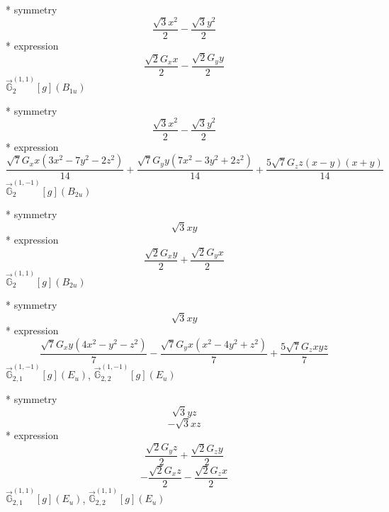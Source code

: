 \documentclass[fleqn,8pt]{jsarticle}
\begin{document}
\noindent\quad ** symmetry
\begin{dmath*}
\frac{\sqrt{3} x^{2}}{2} - \frac{\sqrt{3} y^{2}}{2}
\end{dmath*}
\noindent\quad ** expression
\begin{dmath*}
\frac{\sqrt{2} G_{x} x}{2} - \frac{\sqrt{2} G_{y} y}{2}
\end{dmath*}
\noindent\quad $\vec{\mathbb{G}}_{2}^{(1,1)}[g](B_{1u})$

\noindent\quad ** symmetry
\begin{dmath*}
\frac{\sqrt{3} x^{2}}{2} - \frac{\sqrt{3} y^{2}}{2}
\end{dmath*}
\noindent\quad ** expression
\begin{dmath*}
\frac{\sqrt{7} G_{x} x \left(3 x^{2} - 7 y^{2} - 2 z^{2}\right)}{14} + \frac{\sqrt{7} G_{y} y \left(7 x^{2} - 3 y^{2} + 2 z^{2}\right)}{14} + \frac{5 \sqrt{7} G_{z} z \left(x - y\right) \left(x + y\right)}{14}
\end{dmath*}
\noindent\quad $\vec{\mathbb{G}}_{2}^{(1,-1)}[g](B_{2u})$

\noindent\quad ** symmetry
\begin{dmath*}
\sqrt{3} x y
\end{dmath*}
\noindent\quad ** expression
\begin{dmath*}
\frac{\sqrt{2} G_{x} y}{2} + \frac{\sqrt{2} G_{y} x}{2}
\end{dmath*}
\noindent\quad $\vec{\mathbb{G}}_{2}^{(1,1)}[g](B_{2u})$

\noindent\quad ** symmetry
\begin{dmath*}
\sqrt{3} x y
\end{dmath*}
\noindent\quad ** expression
\begin{dmath*}
\frac{\sqrt{7} G_{x} y \left(4 x^{2} - y^{2} - z^{2}\right)}{7} - \frac{\sqrt{7} G_{y} x \left(x^{2} - 4 y^{2} + z^{2}\right)}{7} + \frac{5 \sqrt{7} G_{z} x y z}{7}
\end{dmath*}
\noindent\quad $\vec{\mathbb{G}}_{2,1}^{(1,-1)}[g](E_{u})$, $\vec{\mathbb{G}}_{2,2}^{(1,-1)}[g](E_{u})$

\noindent\quad ** symmetry
\begin{dmath*}
\sqrt{3} y z
\end{dmath*}
\begin{dmath*}
- \sqrt{3} x z
\end{dmath*}
\noindent\quad ** expression
\begin{dmath*}
\frac{\sqrt{2} G_{y} z}{2} + \frac{\sqrt{2} G_{z} y}{2}
\end{dmath*}
\begin{dmath*}
- \frac{\sqrt{2} G_{x} z}{2} - \frac{\sqrt{2} G_{z} x}{2}
\end{dmath*}
\noindent\quad $\vec{\mathbb{G}}_{2,1}^{(1,1)}[g](E_{u})$, $\vec{\mathbb{G}}_{2,2}^{(1,1)}[g](E_{u})$
\end{document}
